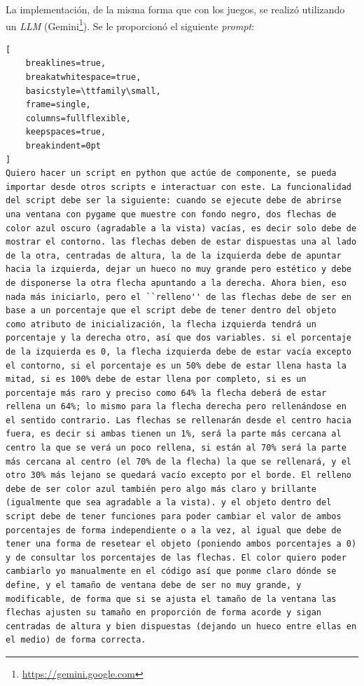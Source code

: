 La implementación, de la misma forma que con los juegos, se realizó utilizando un \textit{LLM} (Gemini\footnote{\url{https://gemini.google.com}}). Se le proporcionó el siguiente \textit{prompt}:

\begingroup %

\emergencystretch=0pt

\begin{lstlisting}[
    breaklines=true,
    breakatwhitespace=true,
    basicstyle=\ttfamily\small,
    frame=single,
    columns=fullflexible,
    keepspaces=true,
    breakindent=0pt
]
Quiero hacer un script en python que actúe de componente, se pueda importar desde otros scripts e interactuar con este. La funcionalidad del script debe ser la siguiente: cuando se ejecute debe de abrirse una ventana con pygame que muestre con fondo negro, dos flechas de color azul oscuro (agradable a la vista) vacías, es decir solo debe de mostrar el contorno. las flechas deben de estar dispuestas una al lado de la otra, centradas de altura, la de la izquierda debe de apuntar hacia la izquierda, dejar un hueco no muy grande pero estético y debe de disponerse la otra flecha apuntando a la derecha. Ahora bien, eso nada más iniciarlo, pero el ``relleno'' de las flechas debe de ser en base a un porcentaje que el script debe de tener dentro del objeto como atributo de inicialización, la flecha izquierda tendrá un porcentaje y la derecha otro, así que dos variables. si el porcentaje de la izquierda es 0, la flecha izquierda debe de estar vacía excepto el contorno, si el porcentaje es un 50% debe de estar llena hasta la mitad, si es 100% debe de estar llena por completo, si es un porcentaje más raro y preciso como 64% la flecha deberá de estar rellena un 64%; lo mismo para la flecha derecha pero rellenándose en el sentido contrario. Las flechas se rellenarán desde el centro hacia fuera, es decir si ambas tienen un 1%, será la parte más cercana al centro la que se verá un poco rellena, si están al 70% será la parte más cercana al centro (el 70% de la flecha) la que se rellenará, y el otro 30% más lejano se quedará vacío excepto por el borde. El relleno debe de ser color azul también pero algo más claro y brillante (igualmente que sea agradable a la vista). y el objeto dentro del script debe de tener funciones para poder cambiar el valor de ambos porcentajes de forma independiente o a la vez, al igual que debe de tener una forma de resetear el objeto (poniendo ambos porcentajes a 0) y de consultar los porcentajes de las flechas. El color quiero poder cambiarlo yo manualmente en el código así que ponme claro dónde se define, y el tamaño de ventana debe de ser no muy grande, y modificable, de forma que si se ajusta el tamaño de la ventana las flechas ajusten su tamaño en proporción de forma acorde y sigan centradas de altura y bien dispuestas (dejando un hueco entre ellas en el medio) de forma correcta.
\end{lstlisting}

